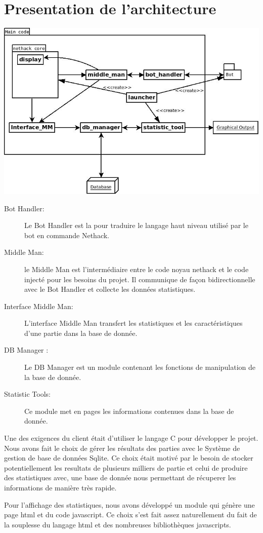 \section{Presentation de l'architecture}

\includegraphics[width=140mm]{Images/new_archi.jpeg}

\begin{description}
\item[Bot Handler: ] Le Bot Handler est la pour traduire le langage haut niveau utilisé par le bot en commande Nethack.
\item[Middle Man: ] le Middle Man est l'intermédiaire entre le code noyau nethack et le code injecté pour les besoins du projet. Il communique de façon bidirectionnelle avec le Bot Handler et collecte les données statistiques.
\item[Interface Middle Man: ] L'interface Middle Man transfert les statistiques et les caractéristiques d'une partie dans la base de donnée.
\item[DB Manager :] Le DB Manager est un module contenant les fonctions de manipulation de la base de donnée.
\item[Statistic Tools:] Ce module met en pages les informations contenues dans la base de donnée.  
\end{description}

Une des exigences du client était d'utiliser le langage C pour développer le projet. Nous avons fait le choix de gérer les résultats des parties avec le Système de gestion de base de données Sqlite. Ce choix était motivé par le besoin de stocker potentiellement les resultats de plusieurs milliers de partie et celui de produire des statistiques avec, une base de donnée nous permettant de récuperer les informations de manière très rapide.

Pour l'affichage des statistiques, nous avons développé un module qui génère une page html et du code javascript. Ce choix s'est fait assez naturellement du fait de la souplesse du langage html et des nombreuses bibliothèques javascripts. 
